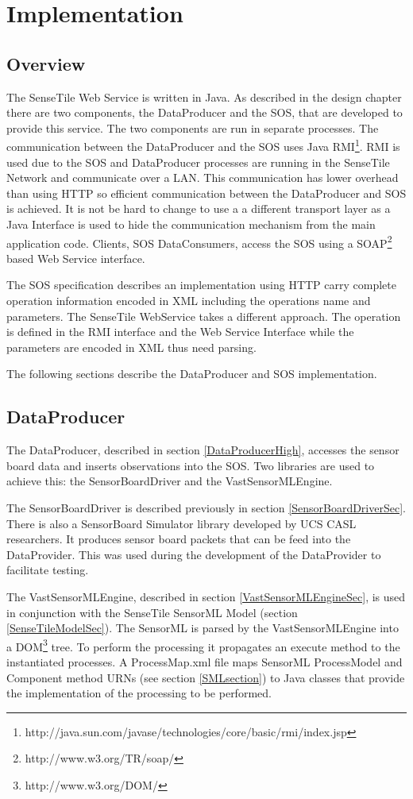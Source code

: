 \documentclass[]{final_report}
\begin{document}
\chapter{Implementation}
\section{Overview}
The SenseTile Web Service is written in Java. As described in the design chapter there are two components, the DataProducer and the SOS, that are developed to provide this service. The two components are run in separate processes. The communication between the DataProducer and the SOS uses Java RMI\footnote{http://java.sun.com/javase/technologies/core/basic/rmi/index.jsp}. RMI is used due to the SOS and DataProducer
processes are running in the SenseTile Network and communicate over a LAN. This communication has lower overhead than using HTTP so efficient communication between the DataProducer and SOS is achieved. It is not be hard to change to use a a different transport layer as a Java Interface is used to hide the communication mechanism from the main application code. Clients, SOS DataConsumers, access the SOS using a SOAP\footnote{http://www.w3.org/TR/soap/} based Web Service interface. 

The SOS specification describes an implementation using HTTP carry complete operation information encoded in XML including the operations name and parameters. The SenseTile WebService takes a different approach. The operation is defined in the RMI interface and the Web Service Interface while the parameters are encoded in XML thus need parsing.

The following sections describe the DataProducer and SOS implementation.
\section{DataProducer}
The DataProducer, described in section \ref{DataProducerHigh}, accesses the sensor board data and inserts observations into the SOS. Two libraries are used to achieve this: the SensorBoardDriver and the VastSensorMLEngine.

The SensorBoardDriver is described previously in section \ref{SensorBoardDriverSec}. There is also a SensorBoard Simulator library developed by UCS CASL researchers. It produces sensor board packets that can be feed into the DataProvider. This was used during the development of the DataProvider to facilitate testing. 

The VastSensorMLEngine, described in section \ref{VastSensorMLEngineSec}, is used in conjunction with the SenseTile SensorML Model (section \ref{SenseTileModelSec}). The SensorML is parsed by the VastSensorMLEngine into a DOM\footnote{http://www.w3.org/DOM/} tree. To perform the processing it propagates an execute method to the instantiated processes. A ProcessMap.xml file maps SensorML ProcessModel and Component method URNs  (see section \ref{SMLsection}) to Java classes that provide the implementation of the processing to be performed. 
\end{document}
